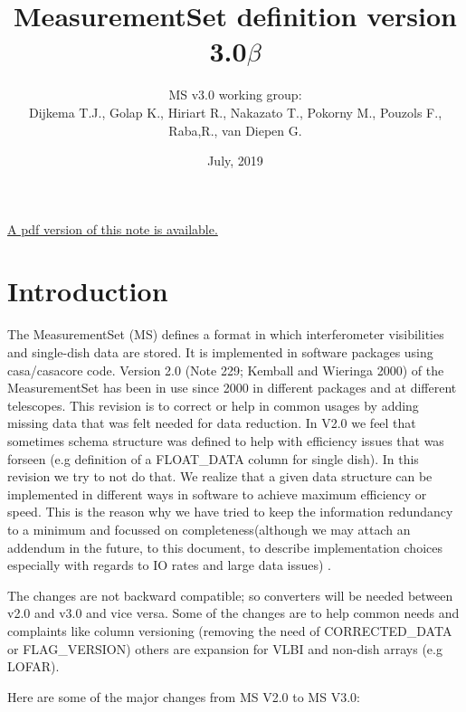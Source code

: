 \documentclass{article}
\begin{document}
\title{MeasurementSet definition version 3.0$\beta$}

\author{ MS v3.0 working group:\\
  Dijkema T.J., Golap K., Hiriart R., Nakazato T., Pokorny M., Pouzols F., Raba,R., van Diepen G.
}
\date{July, 2019}
\maketitle

\ifpdf
\else
\href{264.pdf}{A pdf version of this note is available.}
\fi

\tableofcontents 



\section{Introduction}

The MeasurementSet (MS) defines a format in which interferometer
visibilities and single-dish data are stored. It is implemented in
software packages using casa/casacore code. Version 2.0 (Note 229;
Kemball and Wieringa 2000) of the MeasurementSet has been in use since 2000 in
different packages and at different telescopes. This revision is to
correct or help in common usages by adding missing data that was felt
needed for data reduction. In V2.0 we feel that sometimes schema
structure was defined to help with efficiency issues that was forseen
(e.g definition of a FLOAT\_DATA column for single dish).  In this
revision we try to not do that. We realize that a given data structure
can be implemented in different ways in software to achieve maximum
efficiency or speed. This is the reason why we have tried to keep the
information redundancy to a minimum and focussed on
completeness(although we may attach an addendum in the future, to this
document, to describe implementation choices especially with regards
to IO rates and large data issues) .

The changes are not backward compatible; so converters will be needed
between v2.0 and v3.0 and vice versa. Some of the changes are to help
common needs and complaints like column versioning (removing the need
of CORRECTED\_DATA or FLAG\_VERSION) others are expansion for VLBI and
non-dish arrays (e.g LOFAR).



Here are some of the major changes from MS V2.0 to MS V3.0:
\end{document}
